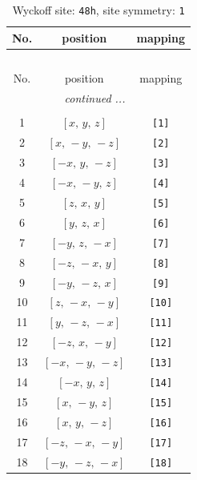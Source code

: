 \documentclass[fleqn,8pt]{jsarticle}
\begin{document}
\begin{longtable}{ccc}
\caption{Wyckoff site: {\tt 48h}, site symmetry: {\tt 1}}
 \\
 \hline \hline
No. & position & mapping \\ \hline \endfirsthead

\multicolumn{2}{l}{\tablename\ \thetable{}} \\
 \hline \hline
No. & position & mapping \\ \hline \endhead

 \hline \hline
\multicolumn{2}{r}{\footnotesize\it continued ...} \\ \endfoot

 \hline \hline
\multicolumn{2}{r}{} \\ \endlastfoot

1 & $\left[ x,\, y,\, z \right]$ & {\tt [1]} \\ \hline
2 & $\left[ x,\, - y,\, - z \right]$ & {\tt [2]} \\ \hline
3 & $\left[ - x,\, y,\, - z \right]$ & {\tt [3]} \\ \hline
4 & $\left[ - x,\, - y,\, z \right]$ & {\tt [4]} \\ \hline
5 & $\left[ z,\, x,\, y \right]$ & {\tt [5]} \\ \hline
6 & $\left[ y,\, z,\, x \right]$ & {\tt [6]} \\ \hline
7 & $\left[ - y,\, z,\, - x \right]$ & {\tt [7]} \\ \hline
8 & $\left[ - z,\, - x,\, y \right]$ & {\tt [8]} \\ \hline
9 & $\left[ - y,\, - z,\, x \right]$ & {\tt [9]} \\ \hline
10 & $\left[ z,\, - x,\, - y \right]$ & {\tt [10]} \\ \hline
11 & $\left[ y,\, - z,\, - x \right]$ & {\tt [11]} \\ \hline
12 & $\left[ - z,\, x,\, - y \right]$ & {\tt [12]} \\ \hline
13 & $\left[ - x,\, - y,\, - z \right]$ & {\tt [13]} \\ \hline
14 & $\left[ - x,\, y,\, z \right]$ & {\tt [14]} \\ \hline
15 & $\left[ x,\, - y,\, z \right]$ & {\tt [15]} \\ \hline
16 & $\left[ x,\, y,\, - z \right]$ & {\tt [16]} \\ \hline
17 & $\left[ - z,\, - x,\, - y \right]$ & {\tt [17]} \\ \hline
18 & $\left[ - y,\, - z,\, - x \right]$ & {\tt [18]} \\ \hline

\end{longtable}
\end{document}
